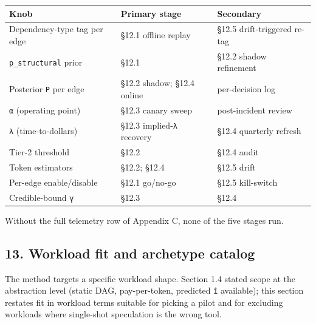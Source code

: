 \documentclass[
  11pt,
]{article}
\newcounter{none} %
\begin{document}
{\def\LTcaptype{none} %
\begin{longtable}[]{@{}
  >{\raggedright\arraybackslash}p{}
  >{\raggedright\arraybackslash}p{}
  >{\raggedright\arraybackslash}p{}@{}}
\toprule\noalign{}
\begin{minipage}[b]{\linewidth}\raggedright
Knob
\end{minipage} & \begin{minipage}[b]{\linewidth}\raggedright
Primary stage
\end{minipage} & \begin{minipage}[b]{\linewidth}\raggedright
Secondary
\end{minipage} \\
\midrule\noalign{}
\endhead
\bottomrule\noalign{}
\endlastfoot
Dependency-type tag per edge & §12.1 offline replay & §12.5
drift-triggered re-tag \\
\texttt{p\_structural} prior & §12.1 & §12.2 shadow refinement \\
Posterior \texttt{P} per edge & §12.2 shadow; §12.4 online &
per-decision log \\
\texttt{α} (operating point) & §12.3 canary sweep & post-incident
review \\
\texttt{λ} (time-to-dollars) & §12.3 implied-\texttt{λ} recovery & §12.4
quarterly refresh \\
Tier-2 threshold & §12.2 & §12.4 audit \\
Token estimators & §12.2; §12.4 & §12.5 drift \\
Per-edge enable/disable & §12.1 go/no-go & §12.5 kill-switch \\
Credible-bound \texttt{γ} & §12.3 & §12.4 \\
\end{longtable}
}

Without the full telemetry row of Appendix C, none of the five stages
run.

\subsection{13. Workload fit and archetype
catalog}\label{workload-fit-and-archetype-catalog}

The method targets a specific workload shape. Section 1.4 stated scope
at the abstraction level (static DAG, pay-per-token, predicted
\texttt{î} available); this section restates fit in workload terms
suitable for picking a pilot and for excluding workloads where
single-shot speculation is the wrong tool.
\end{document}
